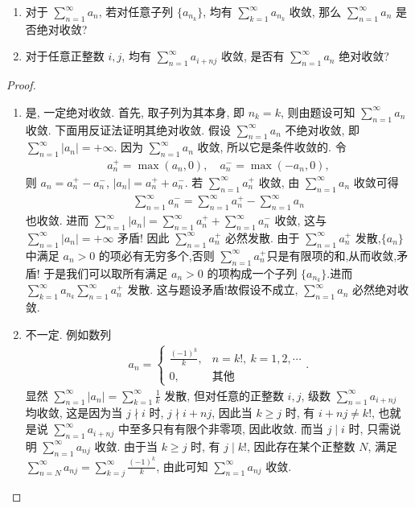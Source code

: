 \documentclass[../../main.tex]{subfiles}%
\begin{document}
\begin{example}
\begin{enumerate}[(1)]
\item 对于 $\sum\limits_{n=1}^{\infty} a_n$, 若对任意子列 $\{a_{n_k}\}$, 均有 $\sum\limits_{k=1}^{\infty} a_{n_k}$ 收敛, 那么 $\sum\limits_{n=1}^{\infty} a_n$ 是否绝对收敛?

\item 对于任意正整数 $i, j$, 均有 $\sum\limits_{n=1}^{\infty} a_{i+nj}$ 收敛, 是否有 $\sum\limits_{n=1}^{\infty} a_n$ 绝对收敛?
\end{enumerate}
\end{example}
\begin{proof}
\begin{enumerate}[(1)]
\item 是, 一定绝对收敛.
首先, 取子列为其本身, 即 $n_k = k$, 则由题设可知 $\sum\limits_{n=1}^{\infty} a_n$ 收敛.
下面用反证法证明其绝对收敛.
假设 $\sum\limits_{n=1}^{\infty} a_n$ 不绝对收敛, 即 $\sum\limits_{n=1}^{\infty} |a_n| = +\infty$.
因为 $\sum\limits_{n=1}^{\infty} a_n$ 收敛, 所以它是条件收敛的.
令
\begin{align*}
a_n^+ = \max(a_n, 0), \quad a_n^- = \max(-a_n, 0),
\end{align*}
则 $a_n = a_n^+ - a_n^-$, $|a_n| = a_n^+ + a_n^-$.
若 $\sum\limits_{n=1}^{\infty} a_n^+$ 收敛, 由 $\sum\limits_{n=1}^{\infty} a_n$ 收敛可得
\begin{align*}
\sum\limits_{n=1}^{\infty} a_n^- = \sum\limits_{n=1}^{\infty} a_n^+ - \sum\limits_{n=1}^{\infty} a_n
\end{align*}
也收敛.
进而 $\sum\limits_{n=1}^{\infty} |a_n| = \sum\limits_{n=1}^{\infty} a_n^+ + \sum\limits_{n=1}^{\infty} a_n^-$ 收敛, 这与 $\sum\limits_{n=1}^{\infty} |a_n| = +\infty$ 矛盾!
因此 $\sum\limits_{n=1}^{\infty} a_n^+$ 必然发散.
由于 $\sum\limits_{n=1}^{\infty} a_n^+$ 发散,$\{a_n\}$中满足 $a_n > 0$ 的项必有无穷多个,否则 $\sum\limits_{n=1}^{\infty} a_n^+$只是有限项的和,从而收敛,矛盾!
于是我们可以取所有满足 $a_n > 0$ 的项构成一个子列 $\{a_{n_k}\}$.进而 $\sum\limits_{k=1}^{\infty} a_{n_k}\sum\limits_{n=1}^{\infty} a_n^+$ 发散.
这与题设矛盾!故假设不成立, $\sum\limits_{n=1}^{\infty} a_n$ 必然绝对收敛.

\item 不一定. 例如数列
\begin{align*}
a_n = \begin{cases} \frac{(-1)^k}{k}, & n = k!, \ k = 1, 2, \cdots \\ 0, & \text{其他} \end{cases}.
\end{align*}
显然 $\sum\limits_{n=1}^{\infty} |a_n| = \sum\limits_{k=1}^{\infty} \frac{1}{k}$ 发散, 但对任意的正整数 $i, j$, 级数 $\sum\limits_{n=1}^{\infty} a_{i+nj}$ 均收敛, 这是因为当 $j \nmid i$ 时, $j \nmid i+nj$, 因此当 $k \geqslant j$ 时, 有 $i+nj \neq k!$, 也就是说 $\sum\limits_{n=1}^{\infty} a_{i+nj}$ 中至多只有有限个非零项, 因此收敛. 而当 $j \mid i$ 时, 只需说明 $\sum\limits_{n=1}^{\infty} a_{nj}$ 收敛. 由于当 $k \geqslant j$ 时, 有 $j \mid k!$, 因此存在某个正整数 $N$, 满足 $\sum\limits_{n=N}^{\infty} a_{nj} = \sum\limits_{k=j}^{\infty} \frac{(-1)^k}{k}$, 由此可知 $\sum\limits_{n=1}^{\infty} a_{nj}$ 收敛.
\end{enumerate}
\end{proof}
\end{document}
